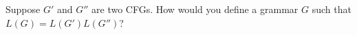 Suppose $G'$ and $G''$ are two CFGs.
How would you define a grammar $G$ such that $L(G) = L(G') L(G'')$?
